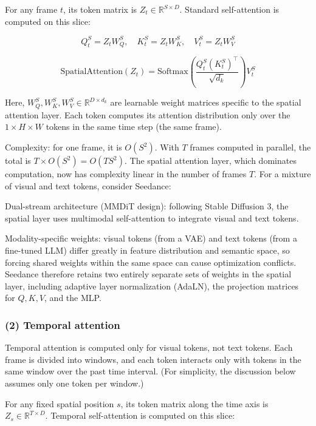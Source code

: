 For any frame \(t\), its token matrix is \(Z_t\in\mathbb{R}^{S\times D}\). Standard self-attention is computed on this slice:

\[
Q_t^S=Z_tW_Q^S,\quad K_t^S=Z_tW_K^S,\quad V_t^S=Z_tW_V^S
\]

\[
\mathrm{SpatialAttention}(Z_t)=\mathrm{Softmax}\left(\frac{Q_t^S(K_t^S)^\top}{\sqrt{d_k}}\right)V_t^S
\]

Here, \(W_Q^S,W_K^S,W_V^S\in\mathbb{R}^{D\times d_k}\) are learnable weight matrices specific to the spatial attention layer. Each token computes its attention distribution only over the \(1\times H\times W\) tokens in the same time step (the same frame).

Complexity: for one frame, it is \(O(S^2)\). With \(T\) frames computed in parallel, the total is \(T\times O(S^2)=O(TS^2)\). The spatial attention layer, which dominates computation, now has complexity linear in the number of frames \(T\).
For a mixture of visual and text tokens, consider Seedance:

Dual-stream architecture (MMDiT design): following Stable Diffusion 3, the spatial layer uses multimodal self-attention to integrate visual and text tokens.

Modality-specific weights: visual tokens (from a VAE) and text tokens (from a fine-tuned LLM) differ greatly in feature distribution and semantic space, so forcing shared weights within the same space can cause optimization conflicts. Seedance therefore retains two entirely separate sets of weights in the spatial layer, including adaptive layer normalization (AdaLN), the projection matrices for \(Q,K,V\), and the MLP.

\hypertarget{temporal-attention}{%
\subsubsection{(2) Temporal attention}\label{temporal-attention}}

Temporal attention is computed only for visual tokens, not text tokens. Each frame is divided into windows, and each token interacts only with tokens in the same window over the past time interval. (For simplicity, the discussion below assumes only one token per window.)

For any fixed spatial position \(s\), its token matrix along the time axis is \(Z_s\in\mathbb{R}^{T\times D}\). Temporal self-attention is computed on this slice:


